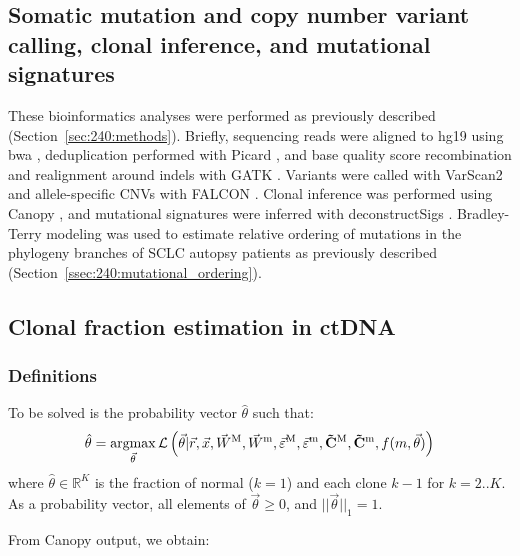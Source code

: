 \subsection[SNVs and CNVs, clonal inference, and mutational signatures]{Somatic mutation and copy number variant calling, clonal inference, and mutational signatures}
These bioinformatics analyses were performed as previously described (Section~\ref{sec:240:methods}). Briefly, sequencing reads were aligned to hg19 using bwa \cite{bwa}, deduplication performed with Picard \cite{Picard2019toolkit}, and base quality score recombination and realignment around indels with GATK \cite{mckenna10}. Variants were called with VarScan2 \cite{varscan2} and allele-specific CNVs with FALCON \cite{falcon}. Clonal inference was performed using Canopy \cite{canopy}, and mutational signatures were inferred with deconstructSigs \cite{rosenthal16}. Bradley-Terry modeling was used to estimate relative ordering of mutations in the phylogeny branches of SCLC autopsy patients as previously described (Section~\ref{ssec:240:mutational_ordering}).

\subsection{Clonal fraction estimation in ctDNA}
\label{ssec:sclc:ctdna_clones}
\subsubsection{Definitions}
\newcommand*{\CM}{\mathbf{\tilde{C}^\text{M}}}
\newcommand*{\Cm}{\mathbf{\tilde{C}^\text{m}}}
To be solved is the probability vector $\hat{\theta}$ such that:
\begin{equation}
    \hat{\theta} = \argmax_{\vec\theta} \mathcal{L}\left(\vec{\theta} | \vec{r}, \vec{x},\vec{W}^\text{M}, \vec{W}^\text{m}, \vec{\varepsilon}^\text{M}, \vec{\varepsilon}^\text{m}, \CM, \Cm, f(m,\vec{\theta})\right)
\end{equation}
where $\hat{\theta} \in \mathbb{R}^K$ is the fraction of normal ($k=1$) and each clone $k-1$ for $k=2..K$. As a probability vector, all elements of $\vec\theta \ge 0$, and $||\vec\theta||_1 = 1$.

From Canopy output, we obtain:

